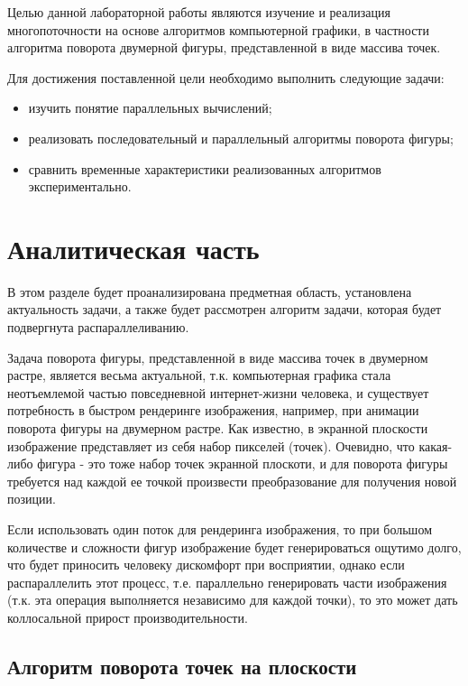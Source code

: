 \documentclass[12pt]{report}
\begin{document}
	
	Целью данной лабораторной работы являются изучение и реализация многопоточности на основе алгоритмов компьютерной графики, в частности алгоритма поворота двумерной фигуры, представленной в виде массива
	точек.
	\newline
	
	Для достижения поставленной цели необходимо выполнить следующие задачи:
	\begin{itemize}
		\item изучить понятие параллельных вычислений;
		\item реализовать последовательный и параллельный алгоритмы поворота фигуры;
		\item сравнить временные характеристики реализованных алгоритмов экспериментально. 
	\end{itemize}
	
	\chapter{Аналитическая часть}
	
	В этом разделе будет проанализирована предметная область, установлена актуальность задачи, а также будет рассмотрен алгоритм задачи, которая будет подвергнута распараллеливанию.
	
	Задача поворота фигуры, представленной в виде массива точек в двумерном растре, является весьма актуальной, т.к. компьютерная графика стала неотъемлемой частью повседневной интернет-жизни человека, и существует потребность в быстром рендеринге изображения, например, при
	анимации поворота фигуры на двумерном растре. Как известно, в экранной плоскости изображение представляет из себя набор пикселей (точек). Очевидно, что какая-либо фигура - это тоже набор точек экранной плоскоти, и для поворота фигуры требуется над каждой ее точкой произвести
	преобразование для получения новой позиции.
	
	Если использовать один поток для рендеринга изображения, то при большом количестве и сложности фигур изображение будет генерироваться ощутимо долго, что будет приносить человеку дискомфорт при восприятии, однако если распараллелить этот процесс, т.е. параллельно генерировать части изображения (т.к. эта операция выполняется независимо для каждой точки), то это может дать коллосальной прирост производительности.
	
	\section{Алгоритм поворота точек на плоскости}
	
\end{document}
